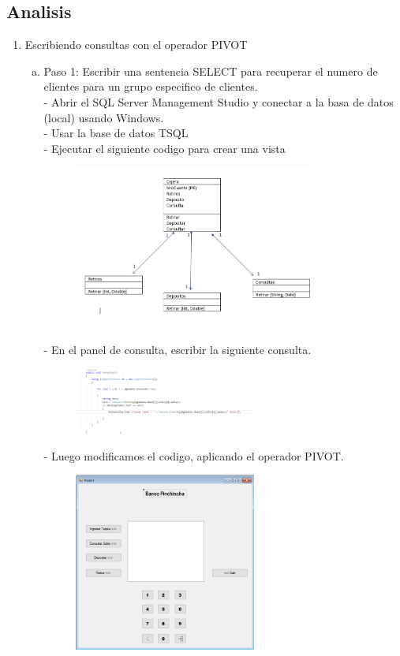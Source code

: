\subsection{Analisis}
\begin{enumerate}[1.]
	\item Escribiendo consultas con el operador PIVOT
	\begin{enumerate}[a)]
	\item Paso 1: Escribir una sentencia SELECT para recuperar el numero de clientes para un grupo especifico de clientes.\\
		-  Abrir el SQL Server Management Studio y conectar a la basa de datos (local) usando Windows.\\
		-  Usar la base de datos TSQL\\
		-  Ejecutar el siguiente codigo para crear una vista\\
		\begin{figure}[H]
		\begin{center}
		\includegraphics[width=8cm]{./Imagenes/img1}
		\end{center}
		\end{figure}
		-  En el panel de consulta, escribir la siguiente consulta.
		\begin{figure}[H]
		\begin{center}
		\includegraphics[width=6cm]{./Imagenes/img16}
		\end{center}
		\end{figure}
		-  Luego modificamos el codigo, aplicando el operador PIVOT.
		\begin{figure}[H]
		\begin{center}
		\includegraphics[width=6cm]{./Imagenes/img2}

\end{center}
\end{figure}
\end{enumerate}
\end{enumerate}
